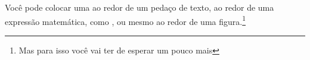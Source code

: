 \documentclass[a4paper,12pt]{article}
\begin{document}
	Você pode colocar uma  ao redor de um pedaço de texto, ao
	redor de uma expressão matemática, como , ou mesmo
	ao redor de uma figura.\footnote{Mas para isso você vai ter de esperar
	um pouco mais}
				
	\begin{center}
	\end{center}
	
	
\end{document}
